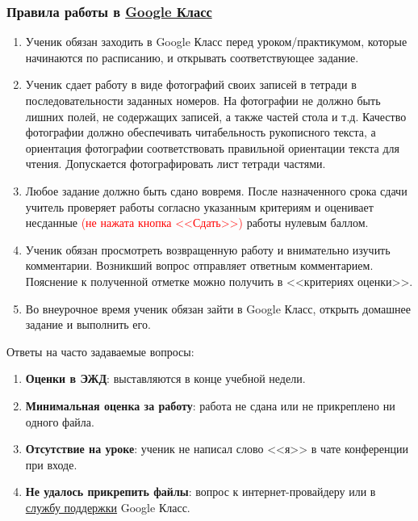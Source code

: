 \documentclass[geometry,a5paper]{pum}
\begin{document}
\subsubsection*{Правила работы в \href{https://classroom.google.com/}{Google Класс}}
\begin{enumerate}[nosep]
  \item Ученик обязан заходить в Google Класс перед уроком/практикумом, которые начинаются по расписанию, и открывать соответствующее задание.
  \item Ученик сдает работу в виде фотографий своих записей в тетради в последовательности заданных номеров. На фотографии не должно быть лишних полей, не содержащих записей, а также частей стола и т.д. Качество фотографии должно обеспечивать читабельность рукописного текста, а ориентация фотографии соответствовать правильной ориентации текста для чтения. Допускается фотографировать лист тетради частями.
  \item Любое задание должно быть сдано вовремя. После назначенного срока сдачи учитель проверяет работы согласно указанным критериям и оценивает несданные \textcolor{red}{(не нажата кнопка <<Сдать>>)} работы нулевым баллом.
  \item Ученик обязан просмотреть возвращенную работу и внимательно изучить комментарии. Возникший вопрос отправляет ответным комментарием. Пояснение к полученной отметке можно получить в <<критериях оценки>>.
  \item Во внеурочное время ученик обязан зайти в Google Класс, открыть домашнее задание и выполнить его.
\end{enumerate}

\begin{pumbox}{Ответы на часто задаваемые вопросы:}
  \begin{enumerate}[nosep]
    \item {\bf Оценки в ЭЖД}: выставляются в конце учебной недели. 
    \item {\bf Минимальная оценка за работу}: работа не сдана или не прикреплено ни одного файла.
    \item {\bf Отсутствие на уроке}: ученик не написал слово <<я>> в чате конференции при входе.
    \item {\bf Не удалось прикрепить файлы}: вопрос к интернет-провайдеру или в \href{https://support.google.com/edu/classroom/?hl=ru#topic=6020277}{службу поддержки} Google Класс.
  \end{enumerate}
\end{pumbox}

\end{document}
